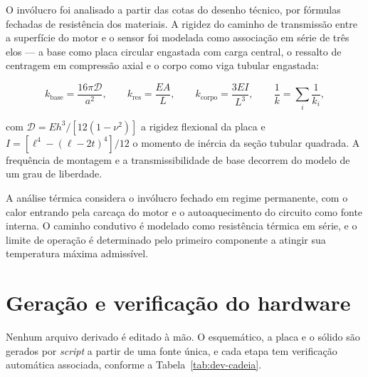 O invólucro foi analisado a partir das cotas do desenho técnico, por fórmulas fechadas de
resistência dos materiais. A rigidez do caminho de transmissão entre a superfície do motor
e o sensor foi modelada como associação em série de três elos --- a base como placa
circular engastada com carga central, o ressalto de centragem em compressão axial e o corpo
como viga tubular engastada:

\begin{equation}
k_{\mathrm{base}} = \frac{16\pi \mathcal{D}}{a^2},
\qquad
k_{\mathrm{res}} = \frac{E A}{L},
\qquad
k_{\mathrm{corpo}} = \frac{3 E I}{L^3},
\qquad
\frac{1}{k} = \sum_i \frac{1}{k_i},
\label{eq:dev-rigidez}
\end{equation}

\noindent
com $\mathcal{D} = E h^3 / [12(1-\nu^2)]$ a rigidez flexional da placa e
$I = [\ell^4 - (\ell-2t)^4]/12$ o momento de inércia da seção tubular quadrada. A
frequência de montagem e a transmissibilidade de base decorrem do modelo de um grau de
liberdade.

A análise térmica considera o invólucro fechado em regime permanente, com o calor entrando
pela carcaça do motor e o autoaquecimento do circuito como fonte interna. O caminho
condutivo é modelado como resistência térmica em série, e o limite de operação é
determinado pelo primeiro componente a atingir sua temperatura máxima admissível.


\section{Geração e verificação do hardware}
\label{sec:dev-hardware}

Nenhum arquivo derivado é editado à mão. O esquemático, a placa e o sólido são gerados por
\emph{script} a partir de uma fonte única, e cada etapa tem verificação automática
associada, conforme a Tabela~\ref{tab:dev-cadeia}.

